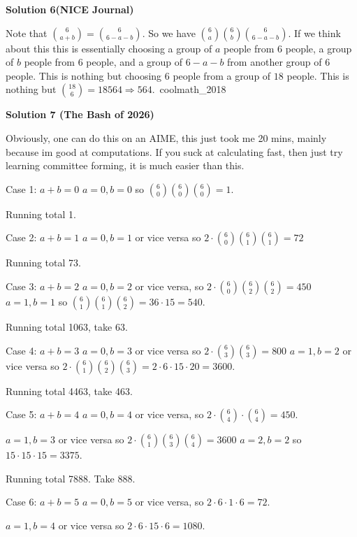 \begin{enumerate}
 



\textbf{Solution 6(NICE Journal)}

Note that $\binom{6}{a+b} = \binom{6}{6-a-b}$. So we have $\binom{6}{a}\binom{6}{b}\binom{6}{6-a-b}$. If we think about this this is essentially choosing a group of $a$ people from $6$ people, a group of $b$ people from $6$ people, and a group of $6 - a -b$ from another group of $6$ people. This is nothing but choosing $6$ people from a group of $18$ people. This is nothing but $\binom{18}{6} = 18564 \Rightarrow 564$.~coolmath\_2018

 



\textbf{Solution 7 (The Bash of 2026)}

Obviously, one can do this on an AIME, this just took me 20 mins, mainly because im good at computations. If you suck at calculating fast, then just try learning committee forming, it is much easier than this.

 Case 1: $a+b = 0$
$a = 0, b = 0$ so $\binom{6}{0} \binom{6}{0} \binom{6}{0} = 1$.

 Running total 1.

 Case 2: $a+b = 1$
$a = 0, b = 1$ or vice versa so $2 \cdot \binom{6}{0} \binom{6}{1} \binom{6}{1} = 72$

 Running total 73.

 Case 3: $a+b = 2$
$a = 0, b = 2$ or vice versa, so $2 \cdot \binom{6}{0} \binom{6}{2} \binom{6}{2} = 450$
$a = 1, b=1$ so $\binom{6}{1} \binom{6}{1} \binom{6}{2} = 36 \cdot 15 = 540$.

 Running total 1063, take 63.

 Case 4: $a+b = 3$
$a = 0, b = 3$ or vice versa so $2 \cdot \binom{6}{3} \binom{6}{3} = 800$
$a = 1, b = 2$ or vice versa so $2 \cdot \binom{6}{1} \binom{6}{2} \binom{6}{3} = 2 \cdot 6 \cdot 15 \cdot 20 = 3600$.

 Running total 4463, take 463.

 Case 5: $a+b = 4$
$a = 0, b = 4$ or vice versa, so $2 \cdot \binom{6}{4} \cdot \binom{6}{4} = 450$.

 $a = 1, b = 3$ or vice versa so $2 \cdot \binom{6}{1} \binom{6}{3} \binom{6}{4} = 3600$
$a = 2, b = 2$ so $15 \cdot 15 \cdot 15 = 3375$.

 Running total 7888. Take 888.

 Case 6: $a+b = 5$
$a= 0, b  = 5$ or vice versa, so $2 \cdot 6 \cdot 1 \cdot 6 = 72$.

 $a=1,b=4$ or vice versa so $2 \cdot 6 \cdot 15 \cdot 6  = 1080$.


\end{enumerate}
